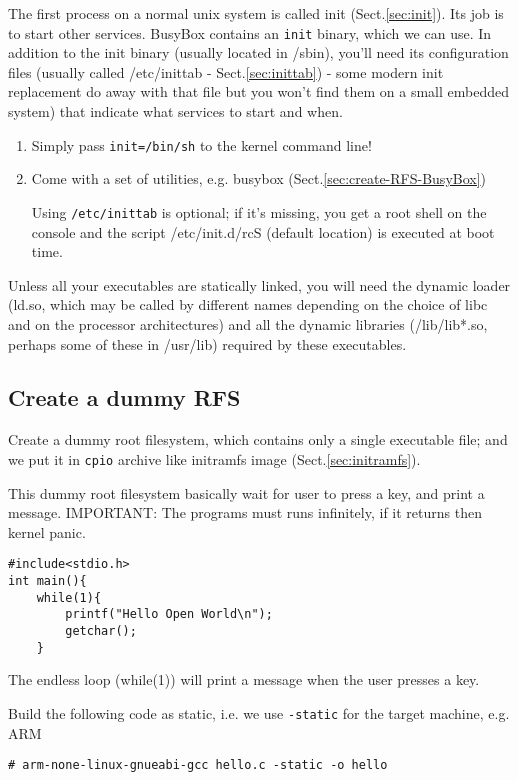 The first process on a normal unix system is called init (Sect.\ref{sec:init}).
Its job is to start other services. BusyBox contains an \verb!init! binary,
which we can use. In addition to the init binary (usually located in /sbin),
you'll need its configuration files (usually called /etc/inittab -
Sect.\ref{sec:inittab}) - some modern init replacement do away with that file
but you won't find them on a small embedded system) that indicate what services
to start and when.
  
\begin{enumerate}
  \item  Simply pass \verb!init=/bin/sh! to the kernel command line!

  \item Come with a set of utilities, e.g. busybox
  (Sect.\ref{sec:create-RFS-BusyBox})
  
Using \verb!/etc/inittab! is optional; if it's missing, you get a root shell on
the console and the script /etc/init.d/rcS (default location) is executed at
boot time.

\end{enumerate}	

Unless all your executables are statically linked, you will need the
  dynamic loader (ld.so, which may be called by different names depending on the
  choice of libc and on the processor architectures) and all the dynamic
  libraries (/lib/lib*.so, perhaps some of these in /usr/lib) required by these
  executables.
  
\subsection{Create a dummy RFS}
\label{sec:create-dummy-RFS}

Create a dummy root filesystem, which contains only a single executable file;
and we put it in \verb!cpio! archive like initramfs image
(Sect.\ref{sec:initramfs}).

This dummy root filesystem basically wait for user to press a key, and print a
message. IMPORTANT: The programs must runs infinitely, if it returns then kernel
panic.

\begin{verbatim}
#include<stdio.h>
int main(){
    while(1){
        printf("Hello Open World\n");
        getchar();
    }
\end{verbatim}
The endless loop (while(1)) will print a message when the user presses a key. 

Build the following code as static, i.e. we use \verb!-static! for the target
machine, e.g. ARM
\begin{verbatim}
# arm-none-linux-gnueabi-gcc hello.c -static -o hello
\end{verbatim}

